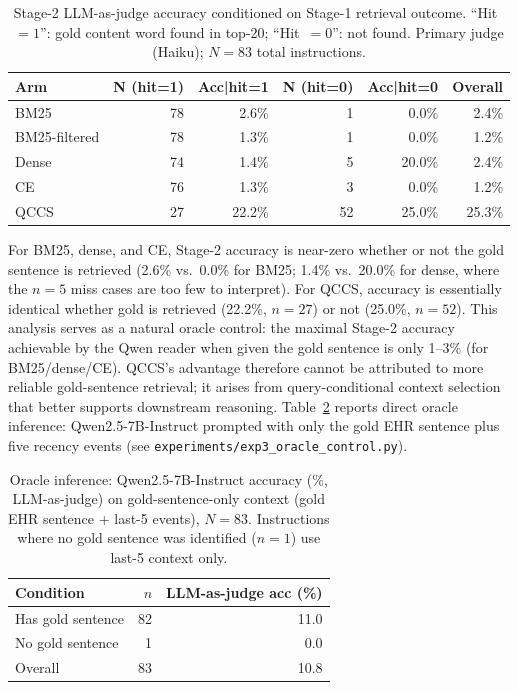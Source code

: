 \documentclass{article}
\begin{document}
\begin{table}[H]
\centering
\caption{Stage-2 LLM-as-judge accuracy conditioned on Stage-1 retrieval outcome.
  ``Hit~$=1$'': gold content word found in top-20; ``Hit~$=0$'': not found.
  Primary judge (Haiku); $N{=}83$ total instructions.}
\label{tab:condacc}
\small
\begin{tabular}{@{}lrrrrr@{}}
\toprule
Arm & N (hit=1) & Acc|hit=1 & N (hit=0) & Acc|hit=0 & Overall \\
\midrule
BM25           & 78 & 2.6\% & 1  & 0.0\% & 2.4\% \\
BM25-filtered  & 78 & 1.3\% & 1  & 0.0\% & 1.2\% \\
Dense          & 74 & 1.4\% & 5  & 20.0\% & 2.4\% \\
CE             & 76 & 1.3\% & 3  & 0.0\% & 1.2\% \\
QCCS           & 27 & 22.2\% & 52 & 25.0\% & 25.3\% \\
\bottomrule
\end{tabular}
\end{table}

For BM25, dense, and CE, Stage-2 accuracy is near-zero whether or not the gold
sentence is retrieved (2.6\% vs.\ 0.0\% for BM25; 1.4\% vs.\ 20.0\% for dense,
where the $n{=}5$ miss cases are too few to interpret). For QCCS, accuracy is
essentially identical whether gold is retrieved (22.2\%, $n{=}27$) or not
(25.0\%, $n{=}52$). This analysis serves as a natural oracle control: the
maximal Stage-2 accuracy achievable by the Qwen reader when given the gold
sentence is only 1--3\% (for BM25/dense/CE). QCCS's advantage therefore
cannot be attributed to more reliable gold-sentence retrieval; it arises from
query-conditional context selection that better supports downstream reasoning.
Table~\ref{tab:oracle} reports direct oracle inference: Qwen2.5-7B-Instruct
prompted with only the gold EHR sentence plus five recency events (see
\texttt{experiments/exp3\_oracle\_control.py}).

\begin{table}[H]
\centering
\caption{Oracle inference: Qwen2.5-7B-Instruct accuracy (\%, LLM-as-judge)
  on gold-sentence-only context (gold EHR sentence + last-5 events), $N{=}83$.
  Instructions where no gold sentence was identified ($n{=}1$) use
  last-5 context only.}
\label{tab:oracle}
\small
\begin{tabular}{@{}lrr@{}}
\toprule
Condition & $n$ & LLM-as-judge acc (\%) \\
\midrule
Has gold sentence & 82 & 11.0 \\
No gold sentence  &  1 &  0.0 \\
Overall           & 83 & 10.8 \\
\bottomrule
\end{tabular}
\end{table}
\end{document}
